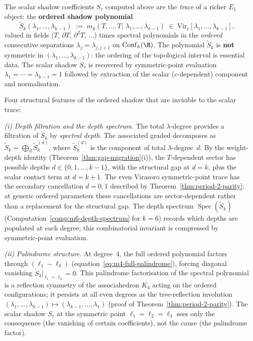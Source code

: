\begin{remark}
\label{rem:ordered-shadow-refinement}%
%
%
%
%
The scalar shadow coefficients $S_r$ computed above are the
\emph{trace} of a richer $E_1$ object: the \textbf{ordered shadow
polynomial}
\begin{equation}\label{eq:ordered-shadow-polynomial}
\widetilde{S}_k(\lambda_1, \ldots, \lambda_{k-1})
\;:=\;
m_k(T, \ldots, T;\, \lambda_1, \ldots, \lambda_{k-1})
\;\in\;
\mathrm{Vir}_c[\lambda_1, \ldots, \lambda_{k-1}],
\end{equation}
valued in fields ($T$, $\partial T$, $\partial^2 T$, $\ldots$)
times spectral polynomials in the \emph{ordered}
consecutive separations $\lambda_j = \lambda_{j,j+1}$ on
$\mathrm{Conf}_k(\R)$. The polynomial $\widetilde{S}_k$ is
\textbf{not} symmetric in $(\lambda_1, \ldots, \lambda_{k-1})$:
the ordering of the topological interval is essential data.
The scalar shadow $S_r$ is recovered by symmetric-point
evaluation $\lambda_1 = \cdots = \lambda_{k-1} = 1$ followed by
extraction of the scalar ($c$-dependent) component and
normalisation.

Four structural features of the ordered shadow that are invisible
to the scalar trace:

\textit{(i) Depth filtration and the depth spectrum.}
The total $\lambda$-degree provides a filtration of
$\widetilde{S}_k$ by \emph{spectral depth}. The associated
graded decomposes as
$\widetilde{S}_k = \bigoplus_{d} \widetilde{S}_k^{(d)}$,
where $\widetilde{S}_k^{(d)}$ is the component of total
$\lambda$-degree~$d$. By the weight-depth identity
(Theorem~\ref{thm:gap-migration}(i)), the $T$-dependent sector
has possible depths \(d \in \{0, 1, \ldots, k-1\}\), with
the structural gap at \(d=k\), plus the scalar contact term at
\(d=k+1\).  The even Virasoro symmetric-point trace has the
secondary cancellation \(d=0,1\) described by
Theorem~\ref{thm:period-2-parity}; at generic ordered parameters
these cancellations are sector-dependent rather than a replacement
for the structural gap.  The depth spectrum
$\operatorname{Spec}(\widetilde{S}_k)$
(Computation~\ref{comp:m6-depth-spectrum} for $k = 6$)
records which depths are populated at each degree; this
combinatorial invariant is compressed by symmetric-point
evaluation.

\textit{(ii) Palindrome structure.}
At degree~$4$, the full ordered polynomial factors through
$(\ell_1 - \ell_3)$ (equation~\eqref{eq:m4-full-palindrome}),
forcing diagonal vanishing $\widetilde{S}_4|_{\ell_1 = \ell_3}
= 0$. This palindrome factorisation of the spectral polynomial
is a reflection symmetry of the associahedron $K_4$ acting on
the ordered configurations; it persists at all even degrees
as the tree-reflection involution
$(\lambda_1, \ldots, \lambda_{k-1}) \mapsto
(\lambda_{k-1}, \ldots, \lambda_1)$ (proof of
Theorem~\ref{thm:period-2-parity}). The scalar shadow $S_r$
at the symmetric point $\ell_1 = \ell_2 = \ell_3$ sees only
the consequence (the vanishing of certain coefficients), not
the cause (the palindrome factor).


\end{remark}
